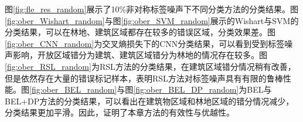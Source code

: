 图\ref{fig:fle_res_random}展示了10\%非对称标签噪声下不同分类方法的分类结果。图\ref{fig:ober_Wishart_random}与图\ref{fig:ober_SVM_random}展示的Wishart与SVM的分类结果，可以在林地、建筑区域都存在较多的错误区域，分类效果差。图\ref{fig:ober_CNN_random}为交叉熵损失下的CNN分类结果，可以看到受到标签噪声影响，开放区域错分为建筑、建筑区域错分为林地的情况存在较多。图\ref{fig:ober_RSL_random}为RSL方法的分类结果，在建筑区域错分情况稍有改善，但是依然存在大量的错误标记样本，表明RSL方法对标签噪声具有有限的鲁棒性能。图\ref{fig:ober_BEL_random}与图\ref{fig:ober_BEL_DP_random}为BEL与BEL+DP方法的分类结果，可以看出在建筑物区域和林地区域的错分情况减少，分类结果更加平滑。因此，证明了本章方法的有效性与优越性。
\begin{figure}[ht!]


\end{figure}
